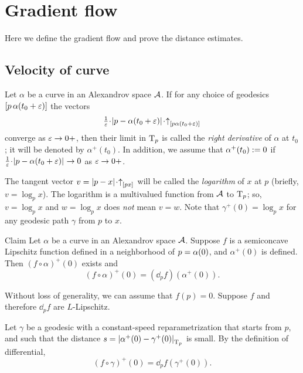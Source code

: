 
\chapter{Gradient flow}\label{chap:GF}

Here we define the gradient flow and prove the distance estimates.



\section{Velocity of curve}\label{Velocity of curve}

Let $\alpha$ be a curve in an Alexandrov space $\mathcal{A}$.
If for any choice of 
geodesics $[p\,\alpha(t_0+\varepsilon)]$ the vectors 
\[\tfrac{1}{\eps}\cdot\dist{p}{\alpha(t_0+\eps)}{}\cdot\dir p{\alpha(t_0+\eps)}\]
converge as $\varepsilon\to 0+$, then their limit in $\mathrm{T}_p$ is called the \emph{right derivative} of $\alpha$ at $t_0$; it will be denoted by $\alpha^+(t_0)$.
In addition, we assume that $\alpha^+(t_0)\mathrel{:=}0$
if $\tfrac{1}{\eps}\cdot\dist{p}{\alpha(t_0+\eps)}{}\to 0$ as $\varepsilon\to 0+$.

The tangent vector $v=\dist px{}\cdot\dir px$ will be called the \emph{logarithm} of $x$ at $p$ (briefly, $v=\log_p x$).
The logarithm is a multivalued function from $\mathcal{A}$ to $\mathrm{T}_p$; so, $v=\log_p x$ and $w=\log_p x$ does \textit{not} mean $v=w$.
Note that $\gamma^+(0)=\log_px$ for any geodesic path $\gamma$ from $p$ to $x$.\label{page:log}

\begin{thm}{Claim}\label{clm:fa'=dfa'}
Let $\alpha$ be a curve in an Alexandrov space $\mathcal{A}$.
Suppose $f$ is a semiconcave Lipschitz function
defined in a neighborhood of $p=\alpha(0)$,
and $\alpha^+(0)$ is defined.
Then $(f\circ\alpha)^+(0)$ exists and 
\[(f\circ\alpha)^+(0)
=
(\dd_pf)(\alpha^+(0)).\]

\end{thm}

Without loss of generality, we can assume that $f(p)=0$.
Suppose $f$ and therefore $\dd_pf$ are $L$-Lipschitz.

Let $\gamma$ be a geodesic with a constant-speed reparametrization that starts from $p$, and
such that the distance
$s=|{\alpha^+(0)}-{\gamma^+(0)}|_{\mathrm{T}_p}^{{}}$
is small.
By the definition of differential,
\[(f\circ\gamma)^+(0)=\dd_pf(\gamma^+(0)).\]

